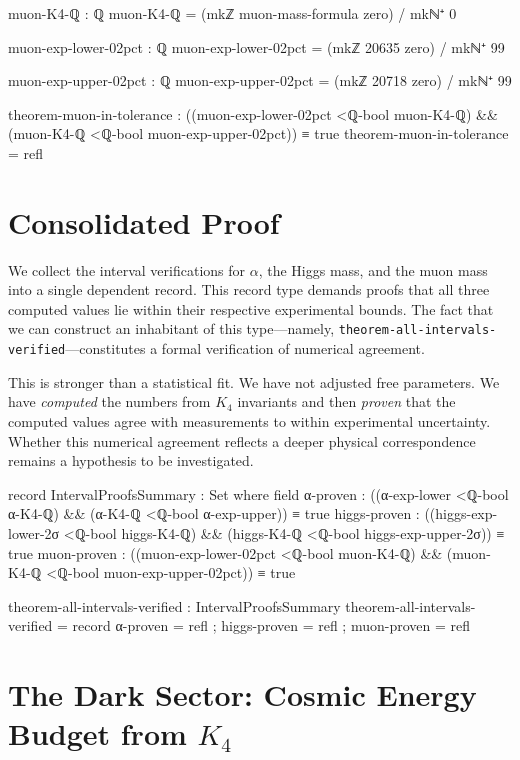 \documentclass[11pt,a4paper]{book}
\begin{document}
\begin{code}
muon-K4-ℚ : ℚ
muon-K4-ℚ = (mkℤ muon-mass-formula zero) / mkℕ⁺ 0

muon-exp-lower-02pct : ℚ
muon-exp-lower-02pct = (mkℤ 20635 zero) / mkℕ⁺ 99

muon-exp-upper-02pct : ℚ
muon-exp-upper-02pct = (mkℤ 20718 zero) / mkℕ⁺ 99

theorem-muon-in-tolerance : ((muon-exp-lower-02pct <ℚ-bool muon-K4-ℚ) && (muon-K4-ℚ <ℚ-bool muon-exp-upper-02pct)) ≡ true
theorem-muon-in-tolerance = refl
\end{code}

\section{Consolidated Proof}

We collect the interval verifications for $\alpha$, the Higgs mass, and the muon mass into 
a single dependent record. This record type demands proofs that all three computed values lie 
within their respective experimental bounds. The fact that we can construct an inhabitant of 
this type---namely, \texttt{theorem-all-intervals-verified}---constitutes a formal verification 
of numerical agreement.

This is stronger than a statistical fit. We have not adjusted free parameters. We have 
\emph{computed} the numbers from $K_4$ invariants and then \emph{proven} that the computed values 
agree with measurements to within experimental uncertainty. Whether this numerical agreement 
reflects a deeper physical correspondence remains a hypothesis to be investigated.

\begin{code}
record IntervalProofsSummary : Set where
  field
    α-proven : ((α-exp-lower <ℚ-bool α-K4-ℚ) && (α-K4-ℚ <ℚ-bool α-exp-upper)) ≡ true
    higgs-proven : ((higgs-exp-lower-2σ <ℚ-bool higgs-K4-ℚ) && (higgs-K4-ℚ <ℚ-bool higgs-exp-upper-2σ)) ≡ true
    muon-proven : ((muon-exp-lower-02pct <ℚ-bool muon-K4-ℚ) && (muon-K4-ℚ <ℚ-bool muon-exp-upper-02pct)) ≡ true

theorem-all-intervals-verified : IntervalProofsSummary
theorem-all-intervals-verified = record
  { α-proven = refl
  ; higgs-proven = refl
  ; muon-proven = refl
  }
\end{code}

\section{The Dark Sector: Cosmic Energy Budget from $K_4$}
\label{sec:dark-sectors}
\end{document}
